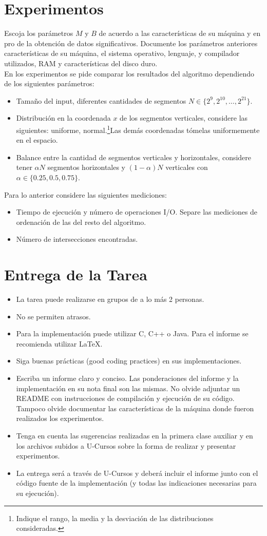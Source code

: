 \documentclass[dcc,uchile]{fcfmcourse}
\begin{document}
\section{Experimentos}
Escoja los parámetros $M$ y $B$ de acuerdo a las características de su máquina y en pro de la obtención de datos significativos. Documente los parámetros anteriores características de su máquina, el sistema operativo, lenguaje, y compilador utilizados, RAM y características del disco duro.\\
En los experimentos se pide comparar los resultados del algoritmo dependiendo de los siguientes parámetros:
\begin{itemize}
    \item Tamaño del input, diferentes cantidades de segmentos $N \in \{2^9, 2^{10},\ldots, 2^{21}\}$.
    \item Distribución en la coordenada $x$ de los segmentos verticales, considere las siguientes: uniforme, normal.\footnote{Indique el rango, la media y la desviación de las distribuciones consideradas.}Las demás coordenadas tómelas uniformemente en el espacio.
    \item Balance entre la cantidad de segmentos verticales y horizontales, considere tener $\alpha N$ segmentos horizontales y $(1-\alpha)N$ verticales con $\alpha \in \{0.25, 0.5, 0.75\}$.
\end{itemize}
Para lo anterior considere las siguientes mediciones:
\begin{itemize}
    \item Tiempo de ejecución y número de operaciones I/O. Separe las mediciones de ordenación de las del resto del algoritmo.
    \item Número de intersecciones encontradas.
\end{itemize}
\section{Entrega de la Tarea}
\begin{itemize}
    \item La tarea puede realizarse en grupos de a lo más 2 personas.
    \item No se permiten atrasos.
    \item Para la implementación puede utilizar C, C++ o Java. Para el informe se recomienda utilizar \LaTeX .
    \item Siga buenas prácticas (good coding practices) en sus implementaciones.
    \item Escriba un informe claro y conciso. Las ponderaciones del informe y la implementación en su nota final son las mismas. No olvide adjuntar un README con instrucciones de compilación y ejecución de su código. Tampoco olvide documentar las características de la máquina donde fueron realizados los experimentos.
    \item Tenga en cuenta las sugerencias realizadas en la primera clase auxiliar y en los archivos subidos a U-Cursos sobre la forma de realizar y presentar experimentos.
    \item La entrega será a través de U-Cursos y deberá incluir el informe junto con el código fuente de la implementación (y todas las indicaciones necesarias para su ejecución).
\end{itemize}
\end{document}
